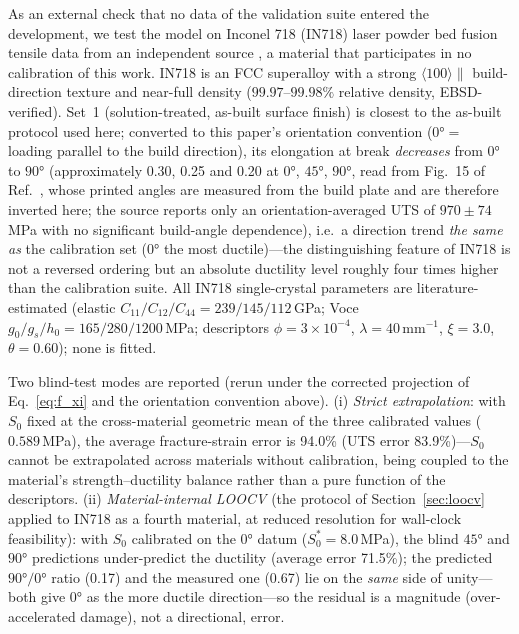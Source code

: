 As an external check that no data of the validation suite entered the development, we test the model on Inconel 718 (IN718) laser powder bed fusion tensile data from an independent source \cite{hovig2018in718}, a material that participates in no calibration of this work. IN718 is an FCC superalloy with a strong $\langle100\rangle\parallel$ build-direction texture and near-full density ($99.97$--$99.98\%$ relative density, EBSD-verified). Set~1 (solution-treated, as-built surface finish) is closest to the as-built protocol used here; converted to this paper's orientation convention ($\ang{0} =$ loading parallel to the build direction), its elongation at break \emph{decreases} from $\ang{0}$ to $\ang{90}$ (approximately 0.30, 0.25 and 0.20 at $\ang{0}$, $\ang{45}$, $\ang{90}$, read from Fig.~15 of Ref.~\cite{hovig2018in718}, whose printed angles are measured from the build plate and are therefore inverted here; the source reports only an orientation-averaged UTS of $970\pm74$\,MPa with no significant build-angle dependence), i.e.\ a direction trend \emph{the same as} the calibration set ($\ang{0}$ the most ductile)---the distinguishing feature of IN718 is not a reversed ordering but an absolute ductility level roughly four times higher than the calibration suite. All IN718 single-crystal parameters are literature-estimated (elastic $C_{11}/C_{12}/C_{44} = 239/145/112$\,GPa; Voce $g_0/g_s/h_0 = 165/280/1200$\,MPa; descriptors $\phi = 3\times10^{-4}$, $\lambda = 40$\,mm$^{-1}$, $\xi = 3.0$, $\theta = 0.60$); none is fitted.

Two blind-test modes are reported (rerun under the corrected projection of Eq.~\eqref{eq:f_xi} and the orientation convention above). (i) \emph{Strict extrapolation}: with $S_0$ fixed at the cross-material geometric mean of the three calibrated values ($0.589$\,MPa), the average fracture-strain error is 94.0\% (UTS error 83.9\%)---$S_0$ cannot be extrapolated across materials without calibration, being coupled to the material's strength--ductility balance rather than a pure function of the descriptors. (ii) \emph{Material-internal LOOCV} (the protocol of Section~\ref{sec:loocv} applied to IN718 as a fourth material, at reduced resolution for wall-clock feasibility): with $S_0$ calibrated on the $\ang{0}$ datum ($S_0^* = 8.0$\,MPa), the blind $\ang{45}$ and $\ang{90}$ predictions under-predict the ductility (average error 71.5\%); the predicted $\ang{90}/\ang{0}$ ratio (0.17) and the measured one (0.67) lie on the \emph{same} side of unity---both give $\ang{0}$ as the more ductile direction---so the residual is a magnitude (over-accelerated damage), not a directional, error.


